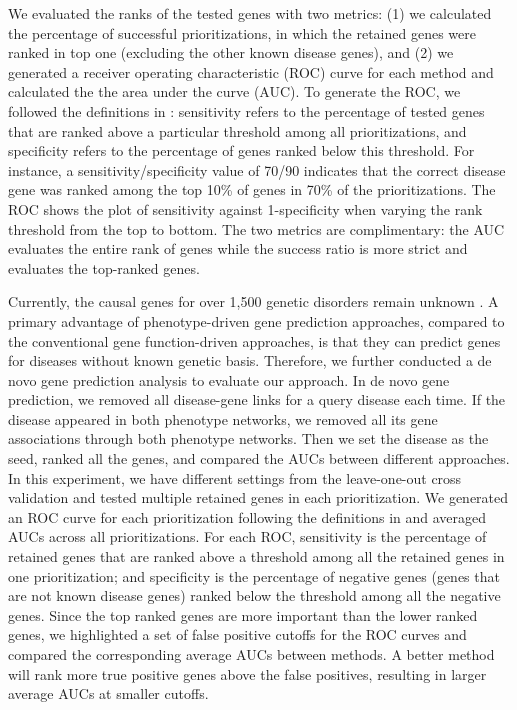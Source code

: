 We evaluated the ranks of the tested genes with two metrics:
(1) we calculated the percentage of successful prioritizations,
in which the retained genes were ranked in top one (excluding the other known disease genes),
and (2) we generated a receiver operating characteristic (ROC) curve for each method
and calculated the the area under the curve (AUC).
To generate the ROC, we followed the definitions in
\cite{aerts2006gene,kohler2008walking,li2010genome}: sensitivity refers to
the percentage of tested genes that are ranked above a particular threshold among all prioritizations, and
specificity refers to the percentage of genes ranked below this threshold.
For instance, a sensitivity/specificity value of 70/90
indicates that the correct disease gene was ranked among the top 10\% of genes in 70\% of the prioritizations.
The ROC shows the plot of sensitivity against 1-specificity
when varying the rank threshold from the top to bottom.
The two metrics are complimentary: the AUC evaluates the entire rank of genes while the
success ratio is more strict and evaluates the top-ranked genes.


Currently, the causal genes for over 1,500 genetic disorders
remain unknown \cite{antonarakis2006mendelian}.
A primary advantage of phenotype-driven gene prediction approaches,
compared to the conventional gene function-driven approaches,
is that they can predict genes for diseases without known genetic basis.
Therefore, we further conducted a de novo gene prediction analysis
to evaluate our approach.
In de novo gene prediction,
we removed all disease-gene links for a query disease each time.
If the disease
appeared in both phenotype networks, we removed all its
gene associations through both phenotype networks.
Then we set the disease as the seed, ranked all the genes,
and compared the AUCs between different approaches.
In this experiment, we have different settings from the leave-one-out
cross validation and tested multiple retained genes in each prioritization.
We generated an ROC curve for each prioritization following the definitions in \cite{chenROC,hwang2012co}
and averaged AUCs across all prioritizations.
For each ROC, sensitivity is the percentage of retained genes that are ranked
above a threshold among all the retained genes in one prioritization;
and specificity is the percentage of negative genes
(genes that are not known disease genes) ranked below
the threshold among all the negative genes.
Since the top ranked genes are more important than the lower ranked genes,
we highlighted a set of false positive cutoffs for the ROC curves
and compared the corresponding average AUCs between methods.
A better method will rank more true positive genes above the false positives,
resulting in larger average AUCs at smaller cutoffs.


